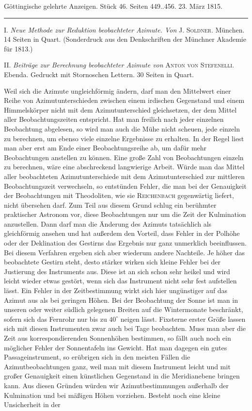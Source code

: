 \clearpage
{}
\begin{center}\small Göttingische gelehrte Anzeigen. Stück 46. Seiten 449..456. 23. März 1815.\\[3pt]\rule{.72\linewidth}{.3pt}\end{center}

I. \emph{Neue Methode zur Reduktion beobachteter Azimute. Von} J. \textsc{Soldner}. München. 14 Seiten in Quart. (Sonderdruck aus den Denkschriften der Münchner Akademie für 1813.)

II. \emph{Beiträge zur Berechnung beobachteter Azimute von} \textsc{Anton von Stefenelli}. Ebenda. Gedruckt mit Stornoschen Lettern. 30 Seiten in Quart.

Weil sich die Azimute ungleichförmig ändern, darf man den Mittelwert einer Reihe von Azimutunterschieden zwischen einem irdischen Gegenstand und einem Himmelskörper nicht mit dem Azimutunterschied gleichsetzen, der dem Mittel aller Beobachtungszeiten entspricht. Hat man freilich nach jeder einzelnen Beobachtung abgelesen, so wird man auch die Mühe nicht scheuen, jede einzeln zu berechnen, um ebenso viele einzelne Ergebnisse zu erhalten. In der Regel liest man aber erst am Ende einer Beobachtungsreihe ab, um dafür mehr Beobachtungen anstellen zu können. Eine große Zahl von Beobachtungen einzeln zu berechnen, wäre eine abschreckend langwierige Arbeit. Würde man das Mittel aller beobachteten Azimutunterschiede mit dem Azimutunterschied zur mittleren Beobachtungszeit verwechseln, so entstünden Fehler, die man bei der Genauigkeit der Beobachtungen mit Theodoliten, wie sie \textsc{Reichenbach} gegenwärtig liefert, nicht übersehen darf. Zum Teil aus diesem Grund schlug ein berühmter praktischer Astronom vor, diese Beobachtungen nur um die Zeit der Kulmination anzustellen. Dann darf man die Änderung des Azimuts tatsächlich als gleichförmig ansehen und hat außerdem den Vorteil, dass Fehler in der Polhöhe oder der Deklination des Gestirns das Ergebnis nur ganz unmerklich beeinflussen. Bei diesem Verfahren ergeben sich aber wiederum andere Nachteile. Je höher das beobachtete Gestirn steht, desto stärker wirken sich kleine Fehler bei der Justierung des Instruments aus. Diese ist an sich schon sehr heikel und wird leicht wieder etwas gestört, wenn sich das Instrument nicht sehr fest aufstellen lässt. Ein Fehler in der Zeitbestimmung wirkt sich hier ungünstiger auf das Azimut aus als bei geringen Höhen. Bei der Beobachtung der Sonne ist man in unseren oder weiter südlich gelegenen Breiten auf die Wintermonate beschränkt, sofern sich das Fernrohr nur bis zu $40^{\circ}$ neigen lässt. Fixsterne erster Größe lassen sich mit diesen Instrumenten zwar auch bei Tage beobachten. Muss man aber die Zeit aus korrespondierenden Sonnenhöhen bestimmen, so fällt auch noch ein möglicher Fehler der Sonnentafeln ins Gewicht. Hat man dagegen ein gutes Passageinstrument, so erübrigen sich in den meisten Fällen die Azimutbeobachtungen ganz, weil man mit diesem Instrument leicht und mit großer Genauigkeit einen künstlichen Gegenstand in die Meridianebene bringen kann. Aus diesen Gründen würden wir Azimutbestimmungen außerhalb der Kulmination und bei mäßigen Höhen vorziehen. Besteht noch eine kleine Unsicherheit in der 